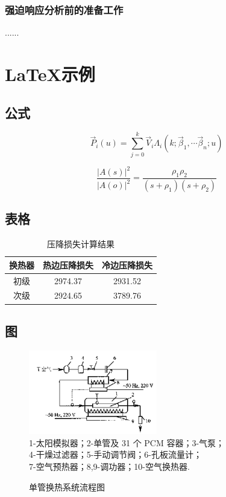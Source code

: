 \documentclass[doctor, openright, oneside]{gdutthesis}
\begin{document}
\subsection{强迫响应分析前的准备工作}
......\par

\chapter{\LaTeX 示例}
\section{公式}
\begin{equation}
\vec{P}_{i}(u)=\sum_{j=0}^{k} \vec{V}_{i} \Lambda_{i}\left(k ; \vec{\beta}_{1}, \cdots \vec{\beta}_{n} ; u\right)
\end{equation}

\begin{equation}
\frac{|A(s)|^{2}}{|A(o)|^{2}}=\frac{\rho_{1} \rho_{2}}{\left(s+\rho_{1}\right)\left(s+\rho_{2}\right)}
\end{equation}

\section{表格}

\begin{table}[h]
\centering
\caption{压降损失计算结果}
\label{table:jiangya}
\begin{tabularx}{\textwidth}{CCC}
\toprule[2pt]
换热器&热边压降损失&冷边压降损失\\
\midrule[1pt]
初级&2974.37&2931.52\\
次级&2924.65&3789.76\\
\bottomrule[2pt]
\end{tabularx}
\end{table}

\section{图}


\begin{figure}[!h]
\centering
\includegraphics[width=0.5\textwidth]{figures/danguan}\\
\footnotesize
1-太阳模拟器；2-单管及 31 个 PCM 容器；3-气泵；\\
4-干燥过滤器；5-手动调节阀；6-孔板流量计；\\
7-空气预热器；8,9-调功器；10-空气换热器.\\
\caption{单管换热系统流程图}
\label{fig:danguan}
\end{figure}
\end{document}
